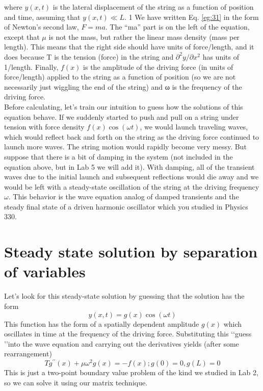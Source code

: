 \documentclass{book}
\theoremstyle{plain}
\theoremstyle{definition}
\numberwithin{exm}{chapter}
\theoremstyle{remark}
\theoremstyle{summary}
\theoremstyle{overview}
\begin{document}
		where $y(x,t)$ is the lateral displacement of the string as a function of position
and time, assuming that $y(x,t) ≪ L.$
1 We have written Eq. \eqref{eg:31} in the form of
Newton\rq s second law, $F = ma$. The “ma” part is on the left of the equation, except
that $\mu$ is not the mass, but rather the linear mass density (mass per length). This
means that the right side should have units of force/length, and it does because
T is the tension (force) in the string and $\partial^2y / \partial x^2$
 has units of 1/length. Finally,
$f (x)$ is the amplitude of the driving force (in units of force/length) applied to the
string as a function of position (so we are not necessarily just wiggling the end of
the string) and ω is the frequency of the driving force. \\
Before calculating, let\rq s train our intuition to guess how the solutions of this
equation behave. If we suddenly started to push and pull on a string under tension
with force density $f(x)\cos(\omega t)$, we would launch traveling waves, which would
reflect back and forth on the string as the driving force continued to launch more
waves. The string motion would rapidly become very messy. But suppose that
there is a bit of damping in the system (not included in the equation above, but in
Lab 5 we will add it). With damping, all of the transient waves due to the initial
launch and subsequent reflections would die away and we would be left with a
steady-state oscillation of the string at the driving frequency $\omega$. This behavior is
the wave equation analog of damped transients and the steady final state of a
driven harmonic oscillator which you studied in Physics 330.		

\section*{Steady state solution by separation of variables}
Let\rq s look for this steady-state solution by guessing that the solution has the form
\begin{equation}\label{eq:32}
		y(x,t) = g(x)\cos(\omega t)
				\end{equation}
				This function has the form of a spatially dependent amplitude $g (x)$ which oscillates in time at the frequency of the driving force. Substituting this \lq\lq guess \rq\rq into the
wave equation and carrying out the derivatives yields (after some rearrangement)
\begin{equation}\label{eq:33}
		Tg^{\prime\prime}(x) + \mu \omega ^ 2 g(x) = -f(x) ; g(0) = 0, g(L) = 0
				\end{equation}
				This is just a two-point boundary value problem of the kind we studied in Lab 2,
so we can solve it using our matrix technique.
\end{document}
